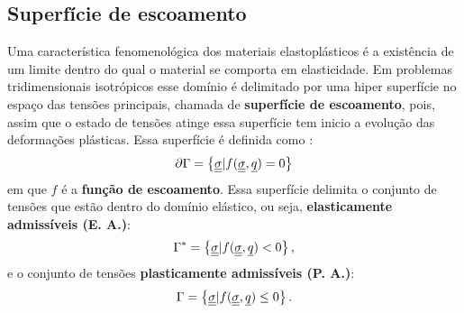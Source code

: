 \subsection{Superfície de escoamento}\label{secao_superficie_escoamento}
Uma característica fenomenológica dos materiais elastoplásticos é a existência de um limite dentro do qual o material se comporta em elasticidade. Em problemas tridimensionais isotrópicos esse domínio é delimitado por uma hiper superfície no espaço das tensões principais, chamada de \textbf{superfície de escoamento}, pois, assim que o estado de tensões atinge essa superfície tem inicio a evolução das deformações plásticas. Essa superfície é definida como \cite[p. 150]{Neto2008}:
\begin{equation}
	\label{eq:superficie_escoamento}
	\partial \Gamma = \left\{ \underline{\underline \sigma} | f(\underline{\underline \sigma},\underline q) = 0 \right\}
\end{equation}
em que $f$ é a \textbf{função de escoamento}. Essa superfície delimita o conjunto de tensões que estão dentro do domínio elástico, ou seja, \textbf{elasticamente admissíveis (E. A.)}:
\begin{equation}
	\label{eq:dominio_elasticamente_admissivel}
	\Gamma^* = \left\{ \underline{\underline \sigma} | f(\underline{\underline \sigma},\underline q) < 0 \right\},
\end{equation}
e o conjunto de tensões \textbf{plasticamente admissíveis (P. A.)}:
\begin{equation}
	\label{eq:dominio_plasticamente_admissivel}
	\Gamma = \left\{ \underline{\underline \sigma} | f(\underline{\underline \sigma},\underline q) \le 0 \right\}.
\end{equation}

